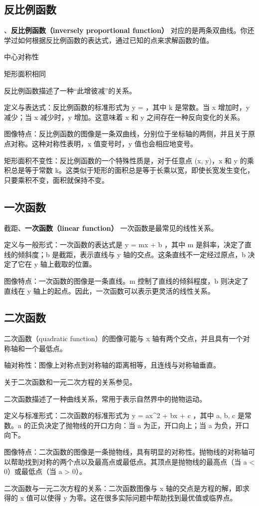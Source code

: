 \subsection{反比例函数}

、\textbf{反比例函数（inversely proportional function）}
对应的是两条双曲线。你还学过如何根据反比例函数的表达式，通过已知的点来求解函数的值。

中心对称性

矩形面积相同

反比例函数描述了一种“此增彼减”的关系。

定义与表达式：反比例函数的标准形式为  y =  ，其中 k 是常数。当 x 增加时，y 减少；当 x 减少时，y 增加。这意味着 x 和 y 之间存在一种反向变化的关系。

图像特点：反比例函数的图像是一条双曲线，分别位于坐标轴的两侧，并且关于原点对称。这种对称性表明，x 值变号时，y 值也会相应地变号。

矩形面积不变性：反比例函数的一个特殊性质是，对于任意点 (x, y)，x 和 y 的乘积总是等于常数 k。这类似于矩形的面积总是等于长乘以宽，即使长宽发生变化，只要乘积不变，面积就保持不变。

\subsection{一次函数}

截距、\textbf{一次函数（linear function）}
一次函数是最常见的线性关系。

定义与一般形式：一次函数的表达式是  y = mx + b ，其中 m 是斜率，决定了直线的倾斜度；b 是截距，表示直线与 y 轴的交点。这条直线不一定经过原点，b 决定了它在 y 轴上截取的位置。

图像特点：一次函数的图像是一条直线。m 控制了直线的倾斜程度，b 则决定了直线在 y 轴上的起点。因此，一次函数可以表示更灵活的线性关系。

\subsection{二次函数}

二次函数（quadratic function）的图像可能与  x  轴有两个交点，并且具有一个对称轴和一个最低点。

轴对称性：图像上对称点到对称轴的距离相等，且连线与对称轴垂直。

关于二次函数和一元二次方程的关系参见。

二次函数描述了一种曲线关系，常用于表示自然界中的抛物运动。

定义与标准形式：二次函数的标准形式为  y = ax^2 + bx + c ，其中 a, b, c 是常数。a 的正负决定了抛物线的开口方向：当 a 为正，开口向上；当 a 为负，开口向下。

图像特点：二次函数的图像是一条抛物线，具有明显的对称性。抛物线的对称轴可以帮助找到对称的两个点以及最高点或最低点。其顶点是抛物线的最高点（当 a < 0）或最低点（当 a > 0）。

二次函数与一元二次方程的关系：二次函数图像与 x 轴的交点是方程的解，即求得的 x 值可以使得 y 为零。这在很多实际问题中帮助找到最优值或临界点。
